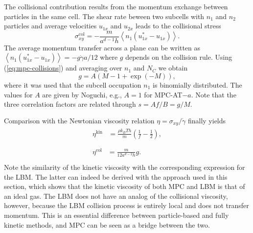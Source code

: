 \documentclass[8.5pt,twoside,twocolumn]{article}
\begin{document}
The collisional contribution results from the momentum exchange between particles in the same cell. The shear rate beween two subcells with $n_1$ and $n_2$ particles and average velocities $u_{1x}$ and $u_{2x}$ leads to the collisional stress
%
%
%
\begin{equation}
\sigma^\text{col}_{xy} = - \frac{m}{a^{d-1} h} \left\langle n_1 \left( u_{1x}^* - u_{1x} \right) \right\rangle .
\end{equation}
%
The average momentum transfer across a plane can be written as $\left\langle n_1 \left( u_{1x}^* - u_{1x} \right) \right\rangle = - g \dot{\gamma} a/12$ where $g$ depends on the collision rule. Using (\ref{eq:mpc-collisions}) and averaging over $n_1$ and $N_C$ we obtain
%
\begin{equation}
g %
= A \left( M-1+\exp(-M) \right)
,
\end{equation}
%
where it was used that the subcell occupation $n_1$ is binomially distributed. The values for $A$ are given by Noguchi\cite{Noguchi:2008}, e.g., $A=1$ for MPC-AT$-a$. Note that the three correlation factors are related through $s=Af/B = g/M$.

Comparison with the Newtonian viscosity relation $\eta=\sigma_{xy}/\dot{\gamma}$ finally yields
%
\begin{align}
  \begin{split}
    \eta^\text{kin} &= \frac{\rho k_BT h}{m} \left( \frac{1}{f} - \frac{1}{2} \right) , \\
  \end{split}\\
  \begin{split}
  \eta^\text{col} &= \frac{m}{12 a^{d-2} h} g . \\%
  \end{split}
\end{align}
%
Note the similarity of the kinetic viscosity with the corresponding expression for the LBM. The latter can indeed be derived with the approach used in this section, which shows that the kinetic viscosity of both MPC and LBM is that of an ideal gas. The LBM does not have an analog of the collisional viscosity, however, because the LBM collision process is entirely local and does not transfer momentum. This is an essential difference between particle-based and fully kinetic methods, and MPC can be seen as a bridge between the two.
\end{document}
